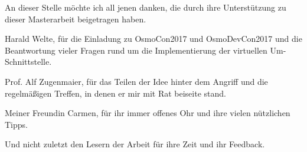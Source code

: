 \vspace*{50px}
An dieser Stelle möchte ich all jenen danken, die durch ihre Unterstützung zu dieser Masterarbeit beigetragen haben.

Harald Welte, für die Einladung zu OsmoCon2017 und OsmoDevCon2017 und die Beantwortung vieler Fragen rund um die Implementierung der virtuellen Um-Schnittstelle. 

Prof. Alf Zugenmaier, für das Teilen der Idee hinter dem Angriff und die regelmäßigen Treffen, in denen er mir mit Rat beiseite stand. 

Meiner Freundin Carmen, für ihr immer offenes Ohr und ihre vielen nützlichen Tipps.

Und nicht zuletzt den Lesern der Arbeit für ihre Zeit und ihr Feedback.